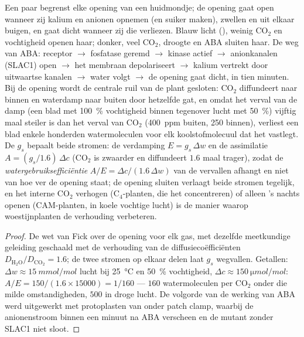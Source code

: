 \begin{proposition}\label{prop:b3:plant-molecular-physiology:stomata}
Een paar \emph{} begrenst elke opening van een huidmondje;
de opening gaat open wanneer zij kalium en anionen opnemen (en suiker
maken), zwellen en uit elkaar buigen, en gaat dicht wanneer zij die
verliezen. Blauw licht (), weinig CO$_{2}$ en vochtigheid
openen haar; donker, veel CO$_{2}$, droogte en ABA sluiten haar. De weg
van ABA: receptor $\to$ fosfatase geremd $\to$ kinase actief $\to$
anionkanalen (SLAC1) open $\to$ het membraan depolariseert $\to$ kalium
vertrekt door uitwaartse kanalen $\to$ water volgt $\to$ de opening
gaat dicht, in tien minuten. Bij de opening wordt de centrale ruil van
de plant gesloten: CO$_{2}$ diffundeert naar binnen en waterdamp naar
buiten door hetzelfde gat, en omdat het verval van de damp (een blad
met \qty{100}{\%} vochtigheid binnen tegenover lucht met \qty{50}{\%})
vijftig maal steiler is dan het verval van CO$_{2}$ (\qty{400}{ppm}
buiten, \qty{250}{} binnen), verliest een blad enkele honderden
watermoleculen voor elk koolstofmolecuul dat het vastlegt. De
\emph{} $g_{s}$ bepaalt beide stromen: de
verdamping $E = g_{s}\,\Delta w$ en de assimilatie
$A = (g_{s}/1.6)\,\Delta c$ (CO$_{2}$ is zwaarder en diffundeert $1.6$
maal trager), zodat de \emph{watergebruiksefficiëntie}
$A/E = \Delta c/(1.6\,\Delta w)$ van de vervallen afhangt en niet van
hoe ver de opening staat; de opening sluiten verlaagt beide stromen
tegelijk, en het interne CO$_{2}$ verhogen (C$_{4}$-planten, die het
concentreren) of alleen 's nachts openen (CAM-planten, in koele
vochtige lucht) is de manier waarop woestijnplanten de verhouding
verbeteren.
\end{proposition}
\begin{proof}
De wet van Fick over de opening voor elk gas, met dezelfde meetkundige
geleiding geschaald met de verhouding van de diffusiecoëfficiënten
$D_{\mathrm{H_2O}}/D_{\mathrm{CO_2}} = 1.6$; de twee stromen op elkaar
delen laat $g_{s}$ wegvallen. Getallen: $\Delta w \approx \qty{15}{mmol/mol}$
lucht bij \qty{25}{\celsius} en \qty{50}{\%} vochtigheid, $\Delta c \approx
\qty{150}{\micro mol/mol}$: $A/E = 150/(1.6\times\num{15000}) = 1/160$
--- $160$ watermoleculen per CO$_{2}$ onder die milde omstandigheden,
$500$ in droge lucht. De volgorde van de werking van ABA werd uitgewerkt
met protoplasten van  onder patch clamp, waarbij de
anionenstroom binnen een minuut na ABA verscheen en de mutant zonder
SLAC1 niet sloot.
\end{proof}

